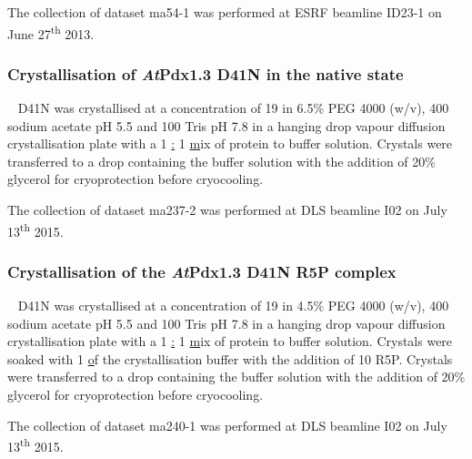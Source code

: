 The collection of dataset ma54-1 was performed at ESRF beamline ID23-1 on June 27\textsuperscript{th} 2013. %

\subsubsection{Crystallisation of \textit{At}Pdx1.3 D41N in the native state}
\atpdx~ D41N was crystallised at a concentration of 19 \mgml in 6.5\% PEG 4000 (w/v), 400 \mM sodium acetate pH 5.5 and 100 \mM Tris pH 7.8 in a hanging drop vapour diffusion crystallisation plate with a 1 \ul : 1 \ul mix of protein to buffer solution. Crystals were transferred to a drop containing the buffer solution with the addition of 20\% glycerol for cryoprotection before cryocooling.

The collection of dataset ma237-2 was performed at DLS beamline I02 on July 13\textsuperscript{th} 2015. %

\subsubsection{Crystallisation of the \textit{At}Pdx1.3 D41N R5P complex}
\atpdx~ D41N was crystallised at a concentration of 19 \mgml in 4.5\% PEG 4000 (w/v), 400 \mM sodium acetate pH 5.5 and 100 \mM Tris pH 7.8 in a hanging drop vapour diffusion crystallisation plate with a 1 \ul : 1 \ul mix of protein to buffer solution. Crystals were soaked with 1 \ul of the crystallisation buffer with the addition of 10 \mM R5P. Crystals were transferred to a drop containing the buffer solution with the addition of 20\% glycerol for cryoprotection before cryocooling. 

The collection of dataset ma240-1 was performed at DLS beamline I02 on July 13\textsuperscript{th} 2015. %

